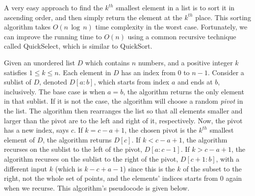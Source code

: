 \documentclass[12pt,english,]{article}
\begin{document}
A very easy approach to find the \(k^{th}\) smallest element in a list
is to sort it in ascending order, and then simply return the element at
the \(k^{th}\) place. This sorting algorithm takes \(O(n\,\log\,n)\)
time complexity in the worst case. Fortunately, we can improve the
running time to \(O(n)\) using a common recursive technique called
QuickSelect, which is similar to QuickSort.

Given an unordered list \(D\) which contains \(n\) numbers, and a
positive integer \(k\) satisfies \(1 \leq k \leq n\). Each element in
\(D\) has an index from \(0\) to \(n-1\). Consider a sublist of \(D\),
denoted \(D[a:b]\), which starts from index \(a\) and ends at \(b\),
inclusively. The base case is when \(a = b\), the algorithm returns the
only element in that sublist. If it is not the case, the algorithm will
choose a random \emph{pivot} in the list. The algorithm then rearranges
the list so that all elements smaller and larger than the pivot are to
the left and right of it, respectively. Now, the pivot has a new index,
says \(c\). If \(k = c-a+1\), the chosen pivot is the \(k^{th}\)
smallest element of \(D\), the algorithm returns \(D[c]\). If
\(k < c-a+1\), the algorithm recurses on the sublist to the left of the
pivot, \(D[a:c-1]\). If \(k > c-a+1\), the algorithm recurses on the
sublist to the right of the pivot, \(D[c+1:b]\), with a different input
\(k\) (which is \(k - c + a -1\)) since this is the \(k\) of the subset
to the right, not the whole set of points, and the elements' indices
starts from 0 again when we recurse. This algorithm's pseudocode is
given below.
\end{document}
